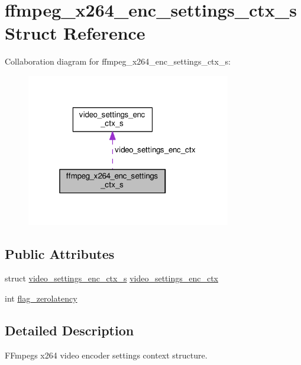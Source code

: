 \hypertarget{structffmpeg__x264__enc__settings__ctx__s}{}\section{ffmpeg\+\_\+x264\+\_\+enc\+\_\+settings\+\_\+ctx\+\_\+s Struct Reference}
\label{structffmpeg__x264__enc__settings__ctx__s}


Collaboration diagram for ffmpeg\+\_\+x264\+\_\+enc\+\_\+settings\+\_\+ctx\+\_\+s\+:\nopagebreak
\begin{figure}[H]
\begin{center}
\leavevmode
\includegraphics[width=253pt]{structffmpeg__x264__enc__settings__ctx__s__coll__graph}
\end{center}
\end{figure}
\subsection*{Public Attributes}
\begin{DoxyCompactItemize}
\item 
struct \hyperlink{structvideo__settings__enc__ctx__s}{video\+\_\+settings\+\_\+enc\+\_\+ctx\+\_\+s} \hyperlink{structffmpeg__x264__enc__settings__ctx__s_a9175e821e0966bbd4264fc7610460571}{video\+\_\+settings\+\_\+enc\+\_\+ctx}
\item 
int \hyperlink{structffmpeg__x264__enc__settings__ctx__s_a5d8b83ae84f8419809222aed45fab94f}{flag\+\_\+zerolatency}
\end{DoxyCompactItemize}


\subsection{Detailed Description}
F\+Fmpeg\textquotesingle{}s x264 video encoder settings context structure. 


